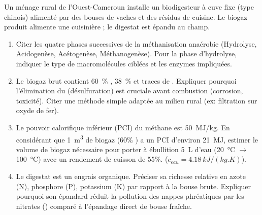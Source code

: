 \documentclass[11pt]{article}
\begin{document}
\begin{exercice}
Un ménage rural de l'Ouest-Cameroun installe un biodigesteur à cuve fixe (type chinois) alimenté par des bouses de vaches et des résidus de cuisine. Le biogaz produit alimente une cuisinière ; le digestat est épandu au champ.
\begin{enumerate}
    \item Citer les quatre phases successives de la méthanisation anaérobie (Hydrolyse, Acidogenèse, Acétogenèse, Méthanogenèse). Pour la phase d'hydrolyse, indiquer le type de macromolécules ciblées et les enzymes impliquées.
    \item Le biogaz brut contient \SI{60}{\%} , \SI{38}{\%}  et traces de . Expliquer pourquoi l'élimination du  (désulfuration) est cruciale avant combustion (corrosion, toxicité). Citer une méthode simple adaptée au milieu rural (ex: filtration sur oxyde de fer).
    \item Le pouvoir calorifique inférieur (PCI) du méthane est \SI{50}{MJ/kg}. En considérant que \SI{1}{m^3} de biogaz (60\% ) a un PCI d'environ \SI{21}{MJ}, estimer le volume de biogaz nécessaire pour porter à ébullition \SI{5}{L} d'eau (\SI{20}{\celsius} $\to$ \SI{100}{\celsius}) avec un rendement de cuisson de 55\%. ($c_{eau} = \SI{4,18}{kJ/(kg.K)}$).
    \item Le digestat est un engrais organique. Préciser sa richesse relative en azote (N), phosphore (P), potassium (K) par rapport à la bouse brute. Expliquer pourquoi son épandard réduit la pollution des nappes phréatiques par les nitrates () comparé à l'épandage direct de bouse fraîche.
\end{enumerate}
\end{exercice}
\end{document}
